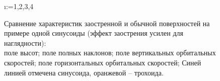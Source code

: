 \begin{figure}[H]
\centering
\makeatletter
    \@for\i:={1,2,3,4}

\label{fig:cwm_demo}
\caption{
    Сравнение характеристик заостренной и обычной поверхностей на примере одной
    синусоиды (эффект заострения усилен для наглядности): \\
     поле высот;
     поле полных наклонов;
     поле вертикальных орбитальных скоростей;
     поле горизонтальных орбитальных скоростей;
    Синей линией отмечена синусоида, оранжевой -- трохоида.
}
\makeatother
\end{figure}




